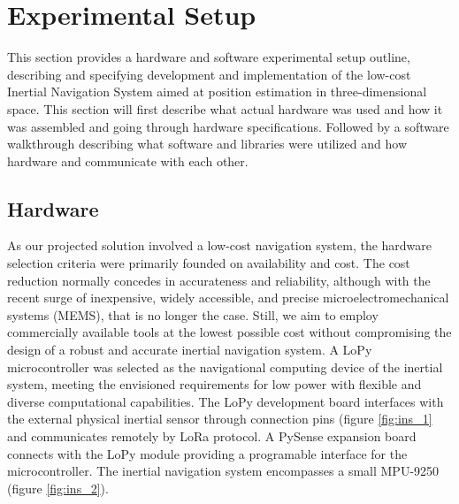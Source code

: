 \section{Experimental Setup}

This section provides a hardware and software experimental setup outline, describing and specifying development and implementation of the low-cost Inertial Navigation System aimed at position estimation in three-dimensional space. This section will first describe what actual hardware was used and how it was assembled and going through hardware specifications. Followed by a software walkthrough describing what software and libraries were utilized and how hardware and communicate with each other.


\subsection{Hardware}

As our projected solution involved a low-cost navigation system, the hardware selection criteria were primarily founded on availability and cost. The cost reduction normally concedes in accurateness and reliability, although with the recent surge of inexpensive, widely accessible, and precise microelectromechanical systems (MEMS), that is no longer the case. Still, we aim to employ commercially available tools at the lowest possible cost without compromising the design of a robust and accurate inertial navigation system. A LoPy microcontroller was selected as the navigational computing device of the inertial system, meeting the envisioned requirements for low power with flexible and diverse computational capabilities. The LoPy development board interfaces with the external physical inertial sensor through connection pins (figure \ref{fig:ins_1} and communicates remotely by LoRa protocol. A PySense expansion board connects with the LoPy module providing a programable interface for the microcontroller. The inertial navigation system encompasses a small MPU-9250 (figure \ref{fig:ins_2}).

